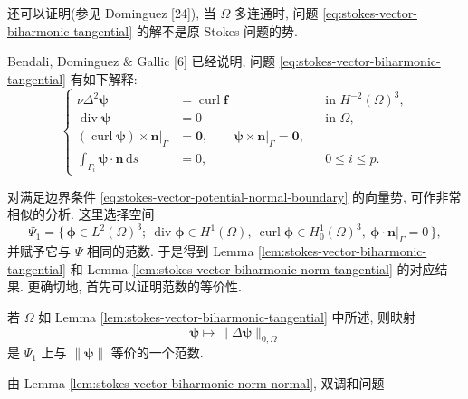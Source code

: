 \setcounter{statement}{7}
\begin{Remark}\label{rem:stokes-vector-biharmonic-not-original-potential}
还可以证明(参见 Dominguez [24]), 当 $\Omega$ 多连通时,
问题 \eqref{eq:stokes-vector-biharmonic-tangential} 的解不是原 Stokes
问题的势.
\end{Remark}

\setcounter{statement}{8}
\begin{Remark}\label{rem:stokes-vector-biharmonic-tangential-strong-form}
Bendali, Dominguez \& Gallic [6] 已经说明, 问题
\eqref{eq:stokes-vector-biharmonic-tangential} 有如下解释:
\begin{equation}\label{eq:stokes-vector-biharmonic-tangential-strong}
\left\{
\begin{aligned}
\nu\Delta^2\boldsymbol{\psi}
&=\operatorname{curl}\mathbf{f}
&&\text{in }H^{-2}(\Omega)^3,\\
\operatorname{div}\boldsymbol{\psi}&=0
&&\text{in }\Omega,\\
(\operatorname{curl}\boldsymbol{\psi})
\times\mathbf{n}|_\Gamma&=\mathbf{0},
\qquad
\boldsymbol{\psi}\times\mathbf{n}|_\Gamma=\mathbf{0},\\
\int_{\Gamma_i}
\boldsymbol{\psi}\cdot\mathbf{n}\,\mathrm{d}s&=0,
&&0\le i\le p.
\end{aligned}
\right.
\end{equation}
\end{Remark}

对满足边界条件
\eqref{eq:stokes-vector-potential-normal-boundary} 的向量势,
可作非常相似的分析. 这里选择空间
\[
\Psi_1
=
\{\,\boldsymbol{\phi}\in L^2(\Omega)^3;
\ \operatorname{div}\boldsymbol{\phi}\in H^1(\Omega),\
\operatorname{curl}\boldsymbol{\phi}\in H_0^1(\Omega)^3,\
\boldsymbol{\phi}\cdot\mathbf{n}|_\Gamma=0\,\},
\]
并赋予它与 $\Psi$ 相同的范数. 于是得到 Lemma
\ref{lem:stokes-vector-biharmonic-tangential} 和 Lemma
\ref{lem:stokes-vector-biharmonic-norm-tangential} 的对应结果.
更确切地, 首先可以证明范数的等价性.

\setcounter{statement}{2}
\begin{Lemma}\label{lem:stokes-vector-biharmonic-norm-normal}
若 $\Omega$ 如 Lemma
\ref{lem:stokes-vector-biharmonic-tangential} 中所述, 则映射
\[
\boldsymbol{\psi}\longmapsto
\|\Delta\boldsymbol{\psi}\|_{0,\Omega}
\]
是 $\Psi_1$ 上与 $\|\boldsymbol{\psi}\|$ 等价的一个范数.
\end{Lemma}

由 Lemma \ref{lem:stokes-vector-biharmonic-norm-normal},
双调和问题

